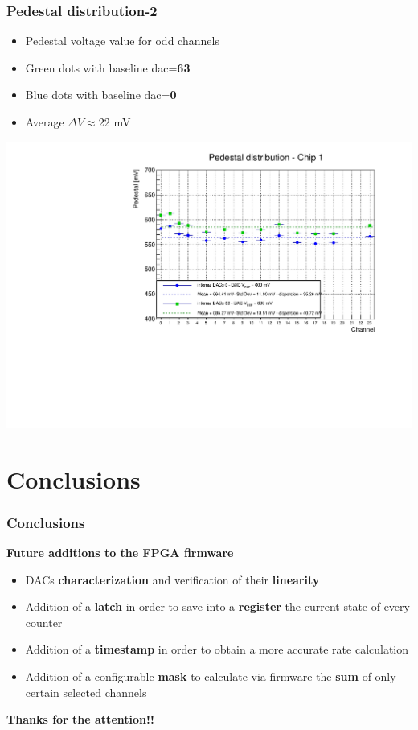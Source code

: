 \documentclass[aspectratio=169]{beamer}
\begin{document}
	\begin{frame}
	\frametitle{Pedestal distribution-2}
	\begin{itemize}
		\item Pedestal voltage value for odd channels
		\item {\color{green}Green} dots with baseline dac=\textbf{63}
		\item {\color{blue}Blue} dots with baseline dac=\textbf{0}
		\item Average $\Delta V\approx$22 mV
	\end{itemize}
	\begin{center}
		\includegraphics[width=0.55 \textwidth]{data/DAC_V_REF_600mV-Copia.pdf}
	\end{center}
	
\end{frame}

	\section{Conclusions}
	
	\begin{frame}
	\frametitle{Conclusions }
	\begin{center}
		{\color{blue}\textbf{Future additions to the FPGA firmware}}
	\end{center}
		\begin{itemize}
			\item DACs \textbf{characterization} and verification of their \textbf{linearity}
			\item Addition of a \textbf{latch} in order to save into a \textbf{register} the current state of every counter 
			\item Addition of a \textbf{timestamp} in order to obtain a more accurate rate calculation 
			\item Addition of a configurable \textbf{mask} to calculate via firmware the \textbf{sum} of only certain selected channels 		
		\end{itemize}
			\vspace{1 cm}
		\begin{center}
			\textbf{Thanks for the attention!!}
		\end{center}	
	\end{frame}
\end{document}
